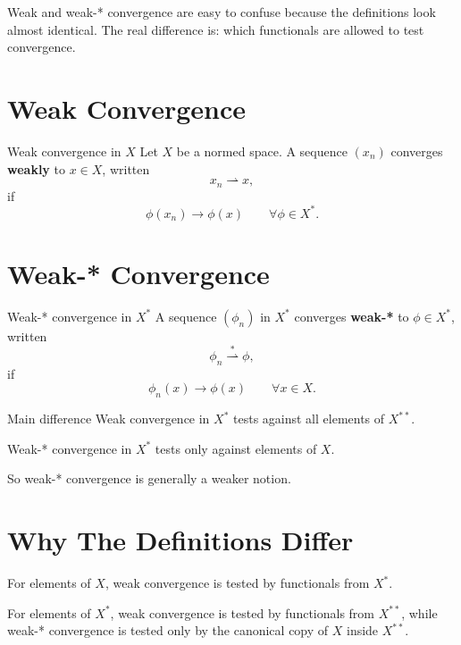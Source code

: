 \documentclass[header={Ancillary Note: Weak vs Weak-*},notheorems]{study-note}
\begin{document}

\vspace{0.8em}

\begin{focusbox}
Weak and weak-* convergence are easy to confuse because the definitions look almost identical. The real difference is: which functionals are allowed to test convergence.
\end{focusbox}

\tableofcontents

\section{Weak Convergence}

\begin{defbox}{Weak convergence in $X$}
Let $X$ be a normed space. A sequence $(x_n)$ converges \textbf{weakly} to $x\in X$, written
\[
x_n\rightharpoonup x,
\]
if
\[
\phi(x_n)\to \phi(x)
\qquad \forall \phi\in X^*.
\]
\end{defbox}

\section{Weak-* Convergence}

\begin{defbox}{Weak-* convergence in $X^*$}
A sequence $(\phi_n)$ in $X^*$ converges \textbf{weak-*} to $\phi\in X^*$, written
\[
\phi_n \overset{*}{\rightharpoonup} \phi,
\]
if
\[
\phi_n(x)\to \phi(x)
\qquad \forall x\in X.
\]
\end{defbox}

\begin{warningbox}{Main difference}
Weak convergence in $X^*$ tests against all elements of $X^{**}$.

Weak-* convergence in $X^*$ tests only against elements of $X$.

So weak-* convergence is generally a weaker notion.
\end{warningbox}

\section{Why The Definitions Differ}

\begin{focusbox}
For elements of $X$, weak convergence is tested by functionals from $X^*$.

For elements of $X^*$, weak convergence is tested by functionals from $X^{**}$, while weak-* convergence is tested only by the canonical copy of $X$ inside $X^{**}$.
\end{focusbox}
\end{document}
